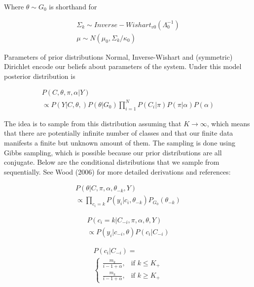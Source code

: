 \documentclass[a4paper]{article}
\begin{document}
Where $\theta \sim G_0$ is shorthand for

\begin{equation}
\begin{aligned}
\Sigma_{k} \sim Inverse-Wishart_{v0}(\Lambda^{-1}_0) \\
\mu \sim N(\mu_0, \Sigma_{k}/\kappa_0)
\end{aligned}
\end{equation}

Parameters of prior distributions Normal, Inverse-Wishart and (symmetric) Dirichlet encode our beliefs about parameters of the system. Under this model posterior distribution is

\begin{equation}
\begin{aligned}
P(C, \theta, \pi, \alpha | Y) \\
\propto P(Y | C, \theta,) P(\theta | G_0) \prod_{i=1}^{N} P(C_i | \pi) P(\pi | \alpha) P(\alpha)
\end{aligned}
\end{equation}

The idea is to sample from this distribution assuming that $K \rightarrow \infty$, which means that there are potentially infinite number of classes and that our finite data manifests a finite but unknown amount of them. The sampling is done using Gibbs sampling, which is possible because our prior distributions are all conjugate. Below are the conditional distributions that we sample from sequentially. See Wood (2006) for more detailed derivations and references:

\begin{equation}
\begin{aligned}
P(\theta | C, \pi, \alpha, \theta_{-k}, Y) \\
\propto  \prod_{c_i=k} P(y_i | c_i, \theta_{-k}) P_{G_0}(\theta_{-k})
\end{aligned}
\label{gauss_theta}
\end{equation} 

\begin{equation}
\begin{aligned}
P(c_i = k | C_{-i}, \pi, \alpha, \theta, Y) \\
\propto P(y_i | c_{-i}, \theta) P(c_i | C_{-i})
\end{aligned}
\label{c_equals_k}
\end{equation} 

\begin{equation}
\begin{aligned}
P(c_i | C_{-i}) =\\
\begin{cases}
\frac{m_k}{i-1+\alpha}, & \text{if } k \leq K_{+} \\
\frac{m_k}{i-1+\alpha}, & \text{if } k \geq K_{+}
\end{cases}
\label{crp}
\end{aligned}
\end{equation} 
\end{document}
